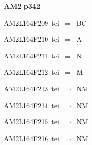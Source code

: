 \par\vfill\eject
{\bf\hfill AM2 p342\hfill\hbox{}}\par\bigskip
{\sixrm AM2L164F209\ {\sixit tei}\ }$\Rightarrow$\ BC\par\smallskip
{\sixrm AM2L164F210\ {\sixit tei}\ }$\Rightarrow$\ A\par\smallskip
{\sixrm AM2L164F211\ {\sixit tei}\ }$\Rightarrow$\ N\par\smallskip
{\sixrm AM2L164F212\ {\sixit tei}\ }$\Rightarrow$\ M\par\smallskip
{\sixrm AM2L164F213\ {\sixit tei}\ }$\Rightarrow$\ NM\par\smallskip
{\sixrm AM2L164F214\ {\sixit tei}\ }$\Rightarrow$\ NM\par\smallskip
{\sixrm AM2L164F215\ {\sixit tei}\ }$\Rightarrow$\ NM\par\smallskip
{\sixrm AM2L164F216\ {\sixit tei}\ }$\Rightarrow$\ NM\par\smallskip

